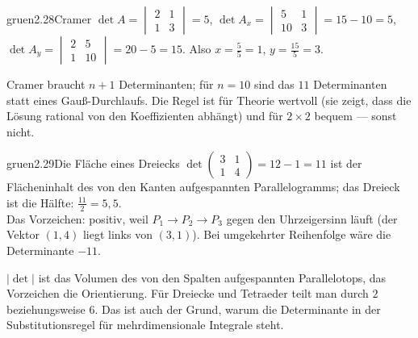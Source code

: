 \begin{loesungkarte}{gruen}{2.28}{Cramer}
$\det A = \begin{vmatrix}2 & 1\\ 1 & 3\end{vmatrix} = 5$, $\det A_x = \begin{vmatrix}5 & 1\\ 10 & 3\end{vmatrix} = 15 - 10 = 5$, $\det A_y = \begin{vmatrix}2 & 5\\ 1 & 10\end{vmatrix} = 20 - 5 = 15$. Also $x = \frac55 = 1$, $y = \frac{15}5 = 3$.
\begin{mitnehmen}\kastentext
Cramer braucht $n + 1$ Determinanten; für $n = 10$ sind das $11$ Determinanten statt eines Gauß-Durchlaufs. Die Regel ist für Theorie wertvoll (sie zeigt, dass die Lösung rational von den Koeffizienten abhängt) und für $2\times2$ bequem --- sonst nicht.
\end{mitnehmen}
\end{loesungkarte}

\begin{loesungkarte}{gruen}{2.29}{Die Fläche eines Dreiecks}
$\det\begin{pmatrix}3 & 1\\ 1 & 4\end{pmatrix} = 12 - 1 = 11$ ist der Flächeninhalt des von den Kanten aufgespannten Parallelogramms; das Dreieck ist die Hälfte: $\frac{11}2 = 5{,}5$. \\
Das Vorzeichen: positiv, weil $P_1\to P_2\to P_3$ gegen den Uhrzeigersinn läuft (der Vektor $(1, 4)$ liegt links von $(3, 1)$). Bei umgekehrter Reihenfolge wäre die Determinante $-11$.
\begin{mitnehmen}\kastentext
$|\det|$ ist das Volumen des von den Spalten aufgespannten Parallelotops, das Vorzeichen die Orientierung. Für Dreiecke und Tetraeder teilt man durch $2$ beziehungsweise $6$. Das ist auch der Grund, warum die Determinante in der Substitutionsregel für mehrdimensionale Integrale steht.
\end{mitnehmen}
\end{loesungkarte}

